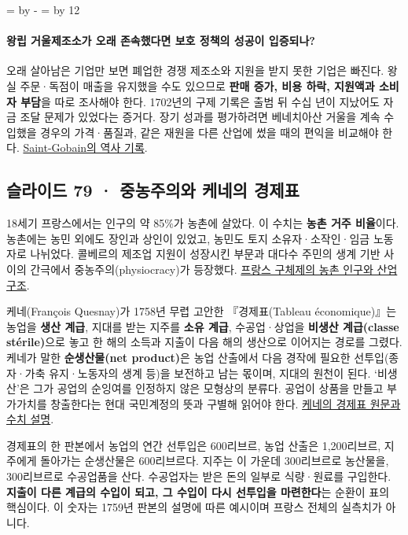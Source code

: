 \documentclass[10pt,a4paper]{article}
\newcommand{\ReserveQuestionSpace}{%
  \par\begingroup
  \dimen0=\pagegoal \advance\dimen0 by -\pagetotal
  \dimen2=\baselineskip \multiply\dimen2 by 12
  \ifdim\dimen0<\dimen2 \newpage\fi
  \endgroup}
\begin{document}
\ReserveQuestionSpace
\paragraph{왕립 거울제조소가 오래 존속했다면 보호 정책의 성공이 입증되나?}
오래 살아남은 기업만 보면 폐업한 경쟁 제조소와 지원을 받지 못한 기업은 빠진다. 왕실 주문·독점이 매출을 유지했을 수도 있으므로 \textbf{판매 증가, 비용 하락, 지원액과 소비자 부담}을 따로 조사해야 한다. 1702년의 구제 기록은 출범 뒤 수십 년이 지났어도 자금 조달 문제가 있었다는 증거다. 장기 성과를 평가하려면 베네치아산 거울을 계속 수입했을 경우의 가격·품질과, 같은 재원을 다른 산업에 썼을 때의 편익을 비교해야 한다. \href{https://archives.saint-gobain.com/decouvrir-nos-histoires/chronologie}{Saint-Gobain의 역사 기록}.\par

\subsection{슬라이드 79 · 중농주의와 케네의 경제표}
18세기 프랑스에서는 인구의 약 85\%가 농촌에 살았다. 이 수치는 \textbf{농촌 거주 비율}이다. 농촌에는 농민 외에도 장인과 상인이 있었고, 농민도 토지 소유자·소작인·임금 노동자로 나뉘었다. 콜베르의 제조업 지원이 성장시킨 부문과 대다수 주민의 생계 기반 사이의 간극에서 중농주의(physiocracy)가 등장했다. \href{https://www.larousse.fr/encyclopedie/divers/Ancien\_R\%C3\%A9gime/105343}{프랑스 구체제의 농촌 인구와 산업 구조}.\par

케네(François Quesnay)가 1758년 무렵 고안한 『경제표(Tableau économique)』는 농업을 \textbf{생산 계급}, 지대를 받는 지주를 \textbf{소유 계급}, 수공업·상업을 \textbf{비생산 계급(classe stérile)}으로 놓고 한 해의 소득과 지출이 다음 해의 생산으로 이어지는 경로를 그렸다. 케네가 말한 \textbf{순생산물(net product)}은 농업 산출에서 다음 경작에 필요한 선투입(종자·가축 유지·노동자의 생계 등)을 보전하고 남는 몫이며, 지대의 원천이 된다. ‘비생산’은 그가 공업의 순잉여를 인정하지 않은 모형상의 분류다. 공업이 상품을 만들고 부가가치를 창출한다는 현대 국민계정의 뜻과 구별해 읽어야 한다. \href{https://courses.cit.cornell.edu/econ6100/TableauEconomiqueFrancoisQuesnay1759.pdf}{케네의 경제표 원문과 수치 설명}.\par

경제표의 한 판본에서 농업의 연간 선투입은 600리브르, 농업 산출은 1,200리브르, 지주에게 돌아가는 순생산물은 600리브르다. 지주는 이 가운데 300리브르로 농산물을, 300리브르로 수공업품을 산다. 수공업자는 받은 돈의 일부로 식량·원료를 구입한다. \textbf{지출이 다른 계급의 수입이 되고, 그 수입이 다시 선투입을 마련한다}는 순환이 표의 핵심이다. 이 숫자는 1759년 판본의 설명에 따른 예시이며 프랑스 전체의 실측치가 아니다.\par
\end{document}
